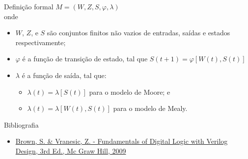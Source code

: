 \begin{frame}{Definição formal}
    $M = (W, Z, S, \varphi, \lambda)$ \\
    onde 
    \begin{itemize}
        \item $W$, $Z$, e $S$ são conjuntos finitos não vazios de entradas, saídas e estados respectivamente;
        \item $\varphi$ é a função de transição de estado, tal que $S(t+1) = \varphi[W(t), S(t)]$
        \item $\lambda$ é a função de saída, tal que:
        \begin{itemize}
            \item $\lambda(t) = \lambda[S(t)]$ para o modelo de Moore; e
            \item $\lambda(t) = \lambda[W (t), S(t)]$ para o modelo de Mealy.
        \end{itemize}
    \end{itemize}
\end{frame}


\begin{frame}{Bibliografia} 
	\begin{itemize}
		\item \href{https://www.google.com.br/search?q=filetype\%3Apdf+Fundamentals+of+Digital+Logic+with+Verilog+Design+&oq=filetype\%3Apdf}{Brown, S. \& Vranesic, Z. - Fundamentals of Digital Logic with Verilog Design, 3rd Ed., Mc Graw Hill, 2009}
	\end{itemize}
\end{frame}

\begin{frame}
	\titlepage
\end{frame} 







